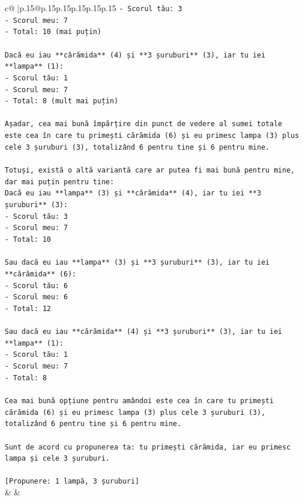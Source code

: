 \documentclass{article}
\begin{document}
{\begin{supertabular}{c@{$\;$}|p{.15\linewidth}@{}p{.15\linewidth}p{.15\linewidth}p{.15\linewidth}p{.15\linewidth}p{.15\linewidth}}
{{{\texttt{{-} Scorul tău: 3} \\
\texttt{{-} Scorul meu: 7} \\
\texttt{{-} Total: 10 (mai puțin)} \\
\\ 
\texttt{Dacă eu iau **cărămida** (4) și **3 șuruburi** (3), iar tu iei **lampa** (1):} \\
\texttt{{-} Scorul tău: 1} \\
\texttt{{-} Scorul meu: 7} \\
\texttt{{-} Total: 8 (mult mai puțin)} \\
\\ 
\texttt{Așadar, cea mai bună împărțire din punct de vedere al sumei totale este cea în care tu primești cărămida (6) și eu primesc lampa (3) plus cele 3 șuruburi (3), totalizând 6 pentru tine și 6 pentru mine.} \\
\\ 
\texttt{Totuși, există o altă variantă care ar putea fi mai bună pentru mine, dar mai puțin pentru tine:} \\
\texttt{Dacă eu iau **lampa** (3) și **cărămida** (4), iar tu iei **3 șuruburi** (3):} \\
\texttt{{-} Scorul tău: 3} \\
\texttt{{-} Scorul meu: 7} \\
\texttt{{-} Total: 10} \\
\\ 
\texttt{Sau dacă eu iau **lampa** (3) și **3 șuruburi** (3), iar tu iei **cărămida** (6):} \\
\texttt{{-} Scorul tău: 6} \\
\texttt{{-} Scorul meu: 6} \\
\texttt{{-} Total: 12} \\
\\ 
\texttt{Sau dacă eu iau **cărămida** (4) și **3 șuruburi** (3), iar tu iei **lampa** (1):} \\
\texttt{{-} Scorul tău: 1} \\
\texttt{{-} Scorul meu: 7} \\
\texttt{{-} Total: 8} \\
\\ 
\texttt{Cea mai bună opțiune pentru amândoi este cea în care tu primești cărămida (6) și eu primesc lampa (3) plus cele 3 șuruburi (3), totalizând 6 pentru tine și 6 pentru mine.} \\
\\ 
\texttt{Sunt de acord cu propunerea ta: tu primești cărămida, iar eu primesc lampa și cele 3 șuruburi.} \\
\\ 
\texttt{{[}Propunere: 1 lampă, 3 șuruburi{]}} \\
            }
        }
    }
    & & \\ \\


\end{supertabular}}
\end{document}
